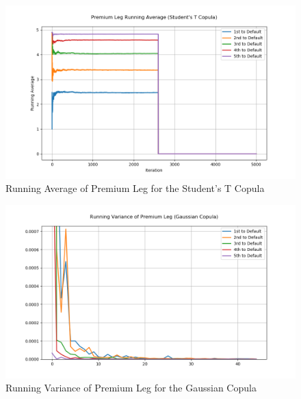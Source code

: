 \documentclass{report}
\theoremstyle{plain}
\theoremstyle{definition}
\begin{document}
\begin{figure}[H]
	\begin{center}
		\includegraphics[width=15cm]{Premium_Leg_Running_Average_(Student's_T_Copula).png}
		\caption{Running Average of Premium Leg for the Student's T Copula} 
		\label{Premium_Leg_Running_Average_(Student's_T_Copula)}
	\end{center}
\end{figure}

\begin{figure}[H]
	\begin{center}
		\includegraphics[width=15cm]{Running_Variance_of_Premium_Leg_(Gaussian_Copula).png}
		\caption{Running Variance of Premium Leg for the Gaussian Copula} 
		\label{Running_Variance_of_Premium_Leg_(Gaussian_Copula)}
	\end{center}
\end{figure}
\end{document}
